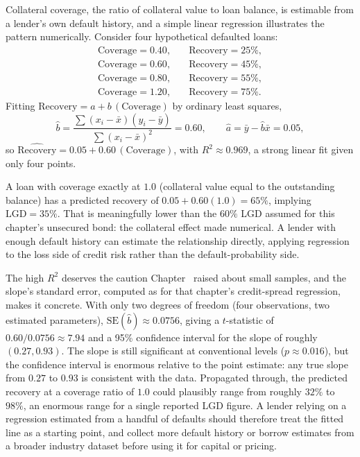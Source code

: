 \documentclass[../ai_in_finance]{subfiles}
\begin{document}
Collateral coverage, the ratio of collateral value to loan balance, is estimable from a lender's own default history, and a simple linear regression illustrates the pattern numerically. Consider four hypothetical defaulted loans:
\begin{align*}
\text{Coverage} = 0.40, &\quad \text{Recovery} = 25\%, \\
\text{Coverage} = 0.60, &\quad \text{Recovery} = 45\%, \\
\text{Coverage} = 0.80, &\quad \text{Recovery} = 55\%, \\
\text{Coverage} = 1.20, &\quad \text{Recovery} = 75\%.
\end{align*} Fitting $\text{Recovery} = a + b\,(\text{Coverage})$ by ordinary least squares,
\begin{equation*}
\hat b = \frac{\sum (x_i-\bar x)(y_i - \bar y)}{\sum (x_i - \bar x)^2} = 0.60, \qquad \hat a = \bar y - \hat b \bar x = 0.05,
\end{equation*}
so $\widehat{\text{Recovery}} = 0.05 + 0.60\,(\text{Coverage})$, with $R^2\approx0.969$, a strong linear fit given only four points.

A loan with coverage exactly at $1.0$ (collateral value equal to the outstanding balance) has a predicted recovery of $0.05+0.60(1.0)=65\%$, implying $\text{LGD}=35\%$. That is meaningfully lower than the $60\%$ LGD assumed for this chapter's unsecured bond: the collateral effect made numerical. A lender with enough default history can estimate the relationship directly, applying regression to the loss side of credit risk rather than the default-probability side.

The high $R^2$ deserves the caution Chapter~ raised about small samples, and the slope's standard error, computed as for that chapter's credit-spread regression, makes it concrete. With only two degrees of freedom (four observations, two estimated parameters), $\text{SE}(\hat b) \approx 0.0756$, giving a $t$-statistic of $0.60/0.0756 \approx 7.94$ and a 95\% confidence interval for the slope of roughly $(0.27, 0.93)$.
The slope is still significant at conventional levels ($p\approx0.016$), but the confidence interval is enormous relative to the point estimate: any true slope from $0.27$ to $0.93$ is consistent with the data. Propagated through, the predicted recovery at a coverage ratio of $1.0$ could plausibly range from roughly $32\%$ to $98\%$, an enormous range for a single reported LGD figure.
A lender relying on a regression estimated from a handful of defaults should therefore treat the fitted line as a starting point, and collect more default history or borrow estimates from a broader industry dataset before using it for capital or pricing.
\end{document}
